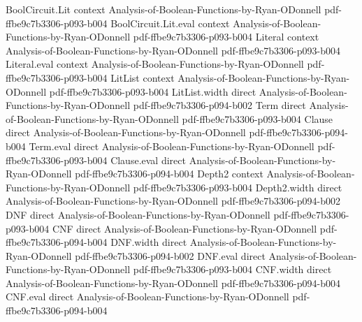 \begin{lemma}
\label{BoolFourier.fourier_coeff_convolution_aux_h_split}
\leanok
{}
\proofstep
  {BoolCircuit.Lit}
  {context}
  {Analysis-of-Boolean-Functions-by-Ryan-ODonnell}
  {pdf-ffbe9c7b3306-p093-b004}
\proofstep
  {BoolCircuit.Lit.eval}
  {context}
  {Analysis-of-Boolean-Functions-by-Ryan-ODonnell}
  {pdf-ffbe9c7b3306-p093-b004}
\proofstep
  {Literal}
  {context}
  {Analysis-of-Boolean-Functions-by-Ryan-ODonnell}
  {pdf-ffbe9c7b3306-p093-b004}
\proofstep
  {Literal.eval}
  {context}
  {Analysis-of-Boolean-Functions-by-Ryan-ODonnell}
  {pdf-ffbe9c7b3306-p093-b004}
\proofstep
  {LitList}
  {context}
  {Analysis-of-Boolean-Functions-by-Ryan-ODonnell}
  {pdf-ffbe9c7b3306-p093-b004}
\proofstep
  {LitList.width}
  {direct}
  {Analysis-of-Boolean-Functions-by-Ryan-ODonnell}
  {pdf-ffbe9c7b3306-p094-b002}
\proofstep
  {Term}
  {direct}
  {Analysis-of-Boolean-Functions-by-Ryan-ODonnell}
  {pdf-ffbe9c7b3306-p093-b004}
\proofstep
  {Clause}
  {direct}
  {Analysis-of-Boolean-Functions-by-Ryan-ODonnell}
  {pdf-ffbe9c7b3306-p094-b004}
\proofstep
  {Term.eval}
  {direct}
  {Analysis-of-Boolean-Functions-by-Ryan-ODonnell}
  {pdf-ffbe9c7b3306-p093-b004}
\proofstep
  {Clause.eval}
  {direct}
  {Analysis-of-Boolean-Functions-by-Ryan-ODonnell}
  {pdf-ffbe9c7b3306-p094-b004}
\proofstep
  {Depth2}
  {context}
  {Analysis-of-Boolean-Functions-by-Ryan-ODonnell}
  {pdf-ffbe9c7b3306-p093-b004}
\proofstep
  {Depth2.width}
  {direct}
  {Analysis-of-Boolean-Functions-by-Ryan-ODonnell}
  {pdf-ffbe9c7b3306-p094-b002}
\proofstep
  {DNF}
  {direct}
  {Analysis-of-Boolean-Functions-by-Ryan-ODonnell}
  {pdf-ffbe9c7b3306-p093-b004}
\proofstep
  {CNF}
  {direct}
  {Analysis-of-Boolean-Functions-by-Ryan-ODonnell}
  {pdf-ffbe9c7b3306-p094-b004}
\proofstep
  {DNF.width}
  {direct}
  {Analysis-of-Boolean-Functions-by-Ryan-ODonnell}
  {pdf-ffbe9c7b3306-p094-b002}
\proofstep
  {DNF.eval}
  {direct}
  {Analysis-of-Boolean-Functions-by-Ryan-ODonnell}
  {pdf-ffbe9c7b3306-p093-b004}
\proofstep
  {CNF.width}
  {direct}
  {Analysis-of-Boolean-Functions-by-Ryan-ODonnell}
  {pdf-ffbe9c7b3306-p094-b004}
\proofstep
  {CNF.eval}
  {direct}
  {Analysis-of-Boolean-Functions-by-Ryan-ODonnell}
  {pdf-ffbe9c7b3306-p094-b004}
\proofstep

\end{lemma}
